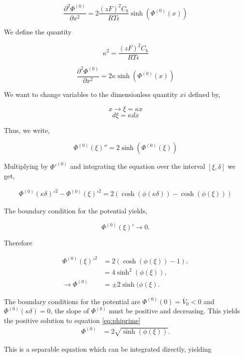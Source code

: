 \begin{equation}
\label{eq:poisson2}
\frac{\partial^2 \Phi^{(0)}}{\partial x^2} = 2\frac{(zF)^2C_b}{RT\epsilon}\sinh{\left(\Phi^{(0)}(x)\right)}
\end{equation}

We define the quantity  

$$\kappa^2  = \frac{(zF)^2C_b}{RT\epsilon}$$

\begin{equation}
\frac{\partial^2 \Phi^{(0)}}{\partial x^2} = 2\kappa \sinh{\left(\Phi^{(0)}(x)\right)}
\end{equation}

We want to change variables to the dimensionless quantity $xi$ defined by,

$$x \rightarrow \xi = \kappa x$$
 $$d \xi  = \kappa d x $$
 
Thus, we write,

\begin{equation}
\Phi^{(0)}(\xi)''= 2\sinh{\left(\Phi^{(0)}(\xi)\right)}
\end{equation}

Multiplying by  $\Phi'^{(0)}$ and integrating the equation over the interval $[\xi, \delta]$ we get,
 
\begin{align}
\Phi^{(0)}(\kappa \delta)'^2  -\Phi^{(0)}(\xi)'^2   = 2(\cosh(\phi(\kappa \delta))-\cosh(\phi(\xi)))
\end{align}

The boundary condition for the potential yields, 

$$\Phi^{(0)}(\xi)' \rightarrow 0.$$

Therefore

\begin{align}
\Phi^{(0)}(\xi)'^2   &= 2(\cosh(\phi(\xi))-1),\\
&= 4\sinh^2(\phi(\xi)), \\
\rightarrow \Phi^{(0)} &= \pm 2\sinh(\phi(\xi).
\label{eq:phiprime}
\end{align}


The boundary conditions for the potential are $\Phi^{(0)}(0) = \bar{V}_0<0$ and $\Phi^{(0)}(\kappa \delta) = 0$, the slope of $\Phi^{(0)}$ must be positive and decreasing. This yields the positive solution to equation \ref{eq:phiprime}
\begin{align}
\Phi^{(0)} &=  2\sqrt{\sinh(\phi(\xi))}.
\end{align}

This is a separable equation which can be integrated directly, yielding


